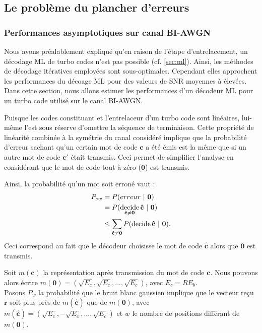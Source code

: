 \subsection{Le problème du plancher d'erreurs}

\subsubsection{Performances asymptotiques sur canal BI-AWGN}
Nous avons préalablement expliqué qu'en raison de l'étape d'entrelacement, un décodage ML de turbo codes n'est pas possible (cf. \ref{sec:ml}). 
Ainsi, les méthodes de décodage itératives employées sont sous-optimales. Cependant elles approchent les performances du décoage ML 
pour des valeurs de SNR moyennes à élevées.
Dans cette section, nous allons estimer les performances d'un décodeur ML pour un turbo code utilisé sur le canal BI-AWGN.

Puisque les codes constituant et l'entrelaceur d'un turbo code sont linéaires, lui-même l'est sous réserve d'omettre la 
séquence de terminaison. Cette propriété de linéarité combinée à la symétrie du canal considéré implique que la probabilité 
d'erreur sachant qu'un certain mot de code $\mathbf{c}$ a été émis est la même que si un autre mot de code $\mathbf{c'}$ 
était transmis. Ceci permet de simplifier l'analyse en considérant que le mot de code tout à zéro ($\mathbf{0}$) est transmis.

Ainsi, la probabilité qu'un mot soit erroné vaut : 
\begin{align}\label{eq:err}
	P_{cw} & = P(erreur~|~\mathbf{0}) \notag                                                             \\
	       & = P( \operatorname*{decide}\limits_{\mathbf{\hat{c}}\neq \mathbf{0}} \mathbf{\hat{c}}~|~\mathbf{0}) \notag \\
	       & \le \sum\limits_{\mathbf{\hat{c}}\neq \mathbf{0}}P( \operatorname*{decide} \mathbf{\hat{c}}~|~\mathbf{0}). 
\end{align}
Ceci correspond au fait que le décodeur choisisse le mot de code $\mathbf{\hat{c}}$ alors que $\mathbf{0}$ est transmis.

Soit $m(\mathbf{c})$ la représentation après transmission du mot de code $\mathbf{c}$. Nous pouvons alors écrire 
$m(\mathbf{0}) = (\sqrt{E_c},\sqrt{E_c},...,\sqrt{E_c})$, avec $E_c = RE_b$.\\
Posons $P_w$ la probabilité que le bruit blanc gaussien implique que le vecteur reçu $\mathbf{r}$ soit plus près de  
$m(\mathbf{\hat{c}})$ que de $m(\mathbf{0})$, avec $m(\mathbf{\hat{c}}) = (\sqrt{E_c},-\sqrt{E_c},...,\sqrt{E_c})$ et 
$w$ le nombre de positions différant de $m(\mathbf{0})$.

